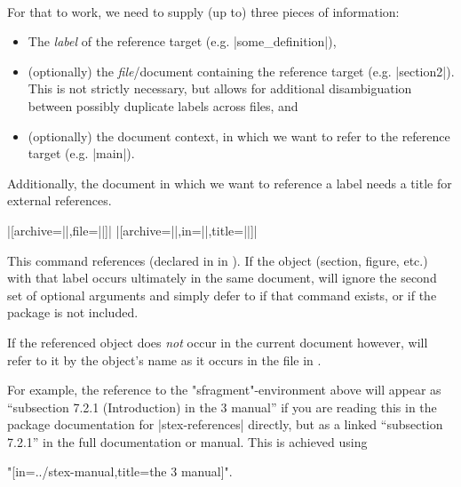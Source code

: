 \paragraph{} For that to work, we need to supply (up to) three pieces
of information:
\begin{itemize}
    \item The \emph{label} of the reference target (e.g. |some_definition|),
    \item (optionally) the \emph{file}/document containing the reference target
        (e.g. |section2|).
        This is not strictly necessary, but allows for additional disambiguation
        between possibly duplicate labels across files, and
    \item (optionally) the document context, in which we want to
        refer to the reference target (e.g. |main|).
\end{itemize}
Additionally, the document in which we want to reference a label needs
a title for external references.


\begin{function}{\sref}
    \begin{syntax} |[archive=||,file=||]|%
        |[archive=||,in=||,title=||]| \end{syntax}
    This command references  (declared in  in ).
    If the object (section, figure, etc.) with that label occurs ultimately
    in the same document,  will ignore the second set of optional arguments
    and simply defer to  if that command exists, or  if the 
    package is not included.

    If the referenced object does \emph{not} occur in the current document however,
     will refer to it by the object's name as it occurs in
    the file  in .

For example, the reference to the \stexcode"sfragment"-environment above
will appear as ``subsection 7.2.1 (Introduction) in the \sTeX{}3 manual''
if you are reading this in the package documentation for |stex-references|
directly, but as a linked ``subsection 7.2.1'' in the full documentation
or manual. This is achieved using 

\stexcode"[in=../stex-manual,title={the \sTeX{}3 manual}]".

\end{function}

